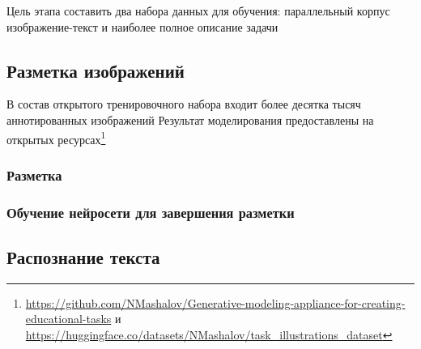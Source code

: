 Цель этапа составить два набора данных для обучения: параллельный корпус изображение-текст и наиболее полное описание задачи

\subsection{Разметка изображений}


В состав открытого тренировочного набора входит более десятка тысяч аннотированных изображений  
Результат моделирования предоставлены 
на открытых ресурсах\footnote{
\url{https://github.com/NMashalov/Generative-modeling-appliance-for-creating-educational-tasks}
и \url{https://huggingface.co/datasets/NMashalov/task_illustrations_dataset}
}

\subsubsection{Разметка}



\subsubsection{Обучение нейросети для завершения разметки}



\subsection{Распознание текста}





